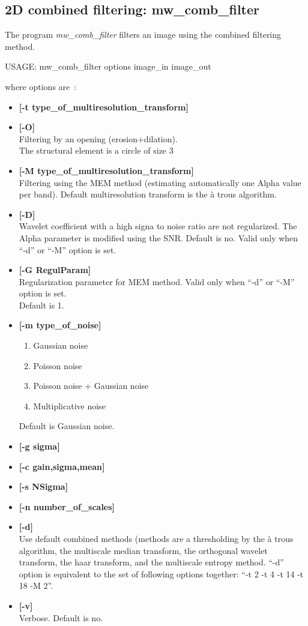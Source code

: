 \subsection{2D combined filtering: mw\_comb\_filter}
The program {\em mw\_comb\_filter} filters an image using the 
combined filtering method. 
{\bf 
\begin{center}
 USAGE: mw\_comb\_filter options image\_in image\_out
\end{center}}
where options are~:
\begin{itemize}
\baselineskip=0.4truecm
\itemsep=0.1truecm
\item {\bf [-t type\_of\_multiresolution\_transform]} 
\item {\bf [-O]} \\
 Filtering by an opening (erosion+dilation). \\
The structural element is a circle of size 3
\item {\bf [-M type\_of\_multiresolution\_transform]} \\
 Filtering using the MEM method (estimating automatically
 one  Alpha value per band). Default multiresolution transform is
 the \`a trous algorithm. 
\item {\bf [-D]} \\
Wavelet coefficient with a high signa to noise ratio are not
regularized. The Alpha parameter is modified using the SNR.
Default is no. Valid only when ``-d'' or ``-M'' option is set.
\item {\bf [-G RegulParam]} \\
Regularization parameter for MEM method. 
Valid only when ``-d'' or ``-M'' option is set. \\
Default is 1.
\item {\bf [-m type\_of\_noise]}
\begin{enumerate}
\baselineskip=0.4truecm
\item Gaussian noise 
\item Poisson noise 
\item Poisson noise + Gaussian noise 
\item Multiplicative noise 
\end{enumerate}
Default is Gaussian noise.
\item {\bf [-g sigma]} 
\item {\bf [-c gain,sigma,mean]}
\item {\bf [-s NSigma]} 
\item {\bf [-n number\_of\_scales]} 
\item {\bf [-d]} \\
Use default combined methods (methods are a thresholding by the 
\`a trous algorithm,
the multiscale median transform, the orthogonal wavelet transform, the haar
transform, and the multiscale entropy method. ``-d'' option is equivalent to
the set of following options together: ``-t 2 -t 4 -t 14 -t 18 -M 2''.
\item {\bf [-v]} \\
Verbose. Default is no.
\end{itemize}
